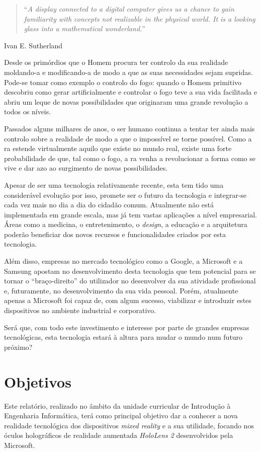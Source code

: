 \documentclass{report}
\begin{document}
\begin{quote}
    ``\emph{A display connected to a digital computer gives us a chance to gain familiarity with concepts not realizable in the physical world. It is a looking glass into a mathematical wonderland.}''\cite{Sutherland65theultimate}
\end{quote}
\begin{flushright}
Ivan E. Sutherland
\end{flushright}

Desde os primórdios que o Homem procura ter controlo da sua realidade moldando-a e modificando-a de modo a que as suas necessidades sejam supridas. Pode-se tomar como exemplo o controlo do fogo: quando o Homem primitivo descobriu como gerar artificialmente e controlar o fogo teve a sua vida facilitada e abriu um leque de novas possibilidades que originaram uma grande revolução a todos os níveis.

Passados alguns milhares de anos, o ser humano continua a tentar ter ainda mais controlo sobre a realidade de modo a que o impossível se torne possível. Como a \ac{ra} estende virtualmente aquilo que existe no mundo real, existe uma forte probabilidade de que, tal como o fogo, a \ac{ra} venha a revolucionar a forma como se vive e dar azo ao surgimento de novas possibilidades.

Apesar de ser uma tecnologia relativamente recente, esta tem tido uma considerável evolução por isso, promete ser o futuro da tecnologia e integrar-se cada vez mais no dia a dia do cidadão comum. Atualmente não está implementada em grande escala, mas já tem vastas aplicações a nível empresarial. Áreas como a medicina, o entretenimento, o \textit{design}, a educação e a arquitetura poderão beneficiar dos novos recursos e funcionalidades criados por esta tecnologia.

Além disso, empresas no mercado tecnológico como a Google, a Microsoft e a Samsung apostam no desenvolvimento desta tecnologia que tem potencial para se tornar o “braço-direito” do utilizador no desenvolver da sua atividade profissional e, futuramente, no desenvolvimento da sua vida pessoal. Porém, atualmente apenas a Microsoft foi capaz de, com algum sucesso, viabilizar e introduzir estes dispositivos no ambiente industrial e corporativo.

Será que, com todo este investimento e interesse por parte de grandes empresas tecnológicas, esta tecnologia estará à altura para mudar o mundo num futuro próximo?

\section{Objetivos}
Este relatório, realizado no âmbito da unidade curricular de Introdução à Engenharia Informática, terá como principal objetivo dar a conhecer a nova realidade tecnológica dos dispositivos \textit{mixed reality} e a sua utilidade, focando nos óculos holográficos de realidade aumentada \textit{HoloLens 2} desenvolvidos pela Microsoft.
\end{document}
